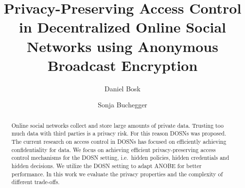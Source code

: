 \title{%
  Privacy-Preserving Access Control in
  Decentralized Online Social Networks using
  Anonymous Broadcast Encryption
}
\author{%
  Daniel Bosk \and
  Sonja Buchegger
}


\mode* %

\begin{abstract}
  Online social networks collect and store large amounts of private data.
  Trusting too much data with third parties is a privacy risk.
  For this reason \acp{DOSN} was proposed.
  The current research on access control in \acp{DOSN} has focused on 
  efficiently achieving confidentiality for data.
  We focus on achieving efficient privacy-preserving access control mechanisms 
  for the \ac{DOSN} setting, i.e.~hidden policies, hidden credentials and 
  hidden decisions.
  We utilize the \ac{DOSN} setting to adapt \ac{ANOBE} for better performance.
  In this work we evaluate the privacy properties and the complexity of 
  different trade-offs.

\end{abstract}


